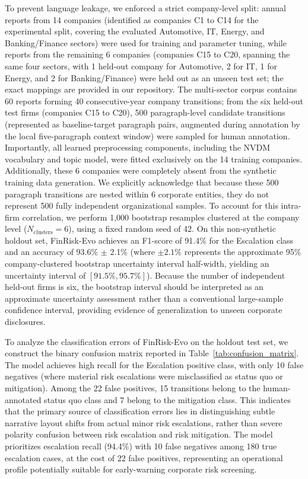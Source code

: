 \documentclass[journal]{IEEEtran}
\begin{document}
To prevent language leakage, we enforced a strict company-level split: annual reports from 14 companies (identified as companies C1 to C14 for the experimental split, covering the evaluated Automotive, IT, Energy, and Banking/Finance sectors) were used for training and parameter tuning, while reports from the remaining 6 companies (companies C15 to C20, spanning the same four sectors, with 1 held-out company for Automotive, 2 for IT, 1 for Energy, and 2 for Banking/Finance) were held out as an unseen test set; the exact mappings are provided in our repository. The multi-sector corpus contains 60 reports forming 40 consecutive-year company transitions; from the six held-out test firms (companies C15 to C20), 500 paragraph-level candidate transitions (represented as baseline-target paragraph pairs, augmented during annotation by the local five-paragraph context window) were sampled for human annotation. Importantly, all learned preprocessing components, including the NVDM vocabulary and topic model, were fitted exclusively on the 14 training companies. Additionally, these 6 companies were completely absent from the synthetic training data generation. We explicitly acknowledge that because these 500 paragraph transitions are nested within 6 corporate entities, they do not represent 500 fully independent organizational samples. To account for this intra-firm correlation, we perform 1,000 bootstrap resamples clustered at the company level ($N_{\text{clusters}}=6$), using a fixed random seed of 42. On this non-synthetic holdout set, FinRisk-Evo achieves an F1-score of 91.4\% for the Escalation class and an accuracy of 93.6\% $\pm$ 2.1\% (where $\pm 2.1\%$ represents the approximate 95\% company-clustered bootstrap uncertainty interval half-width, yielding an uncertainty interval of $[91.5\%, 95.7\%]$). Because the number of independent held-out firms is six, the bootstrap interval should be interpreted as an approximate uncertainty assessment rather than a conventional large-sample confidence interval, providing evidence of generalization to unseen corporate disclosures.

To analyze the classification errors of FinRisk-Evo on the holdout test set, we construct the binary confusion matrix reported in Table~\ref{tab:confusion_matrix}. The model achieves high recall for the Escalation positive class, with only 10 false negatives (where material risk escalations were misclassified as status quo or mitigation). Among the 22 false positives, 15 transitions belong to the human-annotated status quo class and 7 belong to the mitigation class. This indicates that the primary source of classification errors lies in distinguishing subtle narrative layout shifts from actual minor risk escalations, rather than severe polarity confusion between risk escalation and risk mitigation. The model prioritizes escalation recall (94.4\%) with 10 false negatives among 180 true escalation cases, at the cost of 22 false positives, representing an operational profile potentially suitable for early-warning corporate risk screening.
\end{document}

